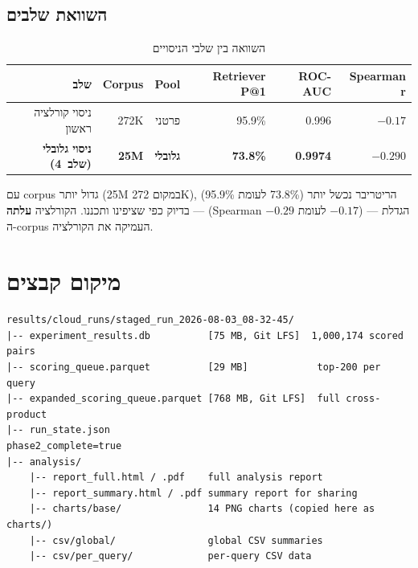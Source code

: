 \documentclass[12pt, a4paper]{article}
\begin{document}
\subsection{השוואת שלבים}

\begin{table}[H]
\centering
\caption{השוואה בין שלבי הניסויים}
\begin{tabular}{rrrrrr}
\toprule
\textbf{שלב} & \textbf{\textenglish{Corpus}} & \textbf{\textenglish{Pool}} & \textbf{\textenglish{Retriever P@1}} & \textbf{\textenglish{ROC-AUC}} & \textbf{\textenglish{Spearman r}} \\
\midrule
ניסוי קורלציה ראשון & 272K & פרטני & 95.9\% & 0.996  & $-0.17$ \\
\textbf{ניסוי גלובלי (שלב~4)} & \textbf{25M} & \textbf{גלובלי} & \textbf{73.8\%} & \textbf{0.9974} & $\mathbf{-0.290}$ \\
\bottomrule
\end{tabular}
\end{table}

עם \textenglish{corpus} גדול יותר (25M במקום 272K), הריטריבר נכשל יותר (73.8\% לעומת 95.9\%) --- בדיוק כפי שציפינו ותכננו. הקורלציה \textbf{עלתה} (\textenglish{Spearman} $-0.29$ לעומת $-0.17$) --- הגדלת ה-\textenglish{corpus} העמיקה את הקורלציה.

\appendix
\section{מיקום קבצים}

\begin{english}
\begin{lstlisting}[style=pipeline]
results/cloud_runs/staged_run_2026-08-03_08-32-45/
|-- experiment_results.db          [75 MB, Git LFS]  1,000,174 scored pairs
|-- scoring_queue.parquet          [29 MB]            top-200 per query
|-- expanded_scoring_queue.parquet [768 MB, Git LFS]  full cross-product
|-- run_state.json                                    phase2_complete=true
|-- analysis/
    |-- report_full.html / .pdf    full analysis report
    |-- report_summary.html / .pdf summary report for sharing
    |-- charts/base/               14 PNG charts (copied here as charts/)
    |-- csv/global/                global CSV summaries
    |-- csv/per_query/             per-query CSV data
\end{lstlisting}
\end{english}
\end{document}

